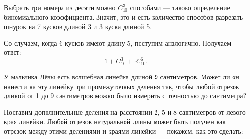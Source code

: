 \begin{itemize}
	Выбрать три номера из десяти можно $C_{10}^3$ способами — таково определение биномиального коэффициента. Значит, это и есть количество способов разрезать шнурок на 7 кусков длиной \SI{3}{} и 3 куска длиной \SI{5}{}.
	
	Со случаем, когда 6 кусков имеют длину 5, поступим аналогично. Получаем ответ:
	$$1 + C_{10}^3 + \cdot C_{10}^6.$$
	
	\itC У мальчика Лёвы есть волшебная линейка длиной 9 сантиметров. Может ли он нанести на эту линейку три промежуточных деления так, чтобы любой отрезок длиной от 1 до 9 сантиметров можно было измерить с точностью до сантиметра?
	
	\itr Поставим дополнительные деления на расстоянии 2, 5 и 8 сантиметров от левого края линейки. Любой отрезок натуральной длины может быть получен как отрезок между этими делениями и краями линейки — покажем, как это сделать:

	

\end{itemize}


